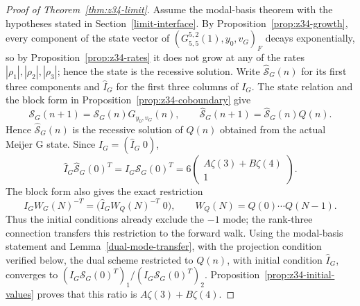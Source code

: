 \documentclass[11pt]{article}
\begin{document}
\begin{proof}[Proof of Theorem~\ref{thm:z34-limit}]
Assume the modal-basis theorem with the hypotheses stated in
Section~\ref{limit-interface}. By Proposition~\ref{prop:z34-growth}, every component of the
state vector of $(G^{5,2}_{5,5}(1),y_0,v_G)_F$ decays exponentially, so by
Proposition~\ref{prop:z34-rates} it does not grow at any of the rates
$|\rho_1|,|\rho_2|,|\rho_3|$; hence the state is the recessive solution.
Write $\widehat{\mathcal S}_G(n)$ for its first three components and
$\widehat I_G$ for the first three columns of $I_G$.
The state relation and the block form in
Proposition~\ref{prop:z34-coboundary} give
\[
\mathcal S_G(n+1)=\mathcal S_G(n)G_{y_0,v_G}(n),
\qquad
\widehat{\mathcal S}_G(n+1)=\widehat{\mathcal S}_G(n)Q(n).
\]
Hence $\widehat{\mathcal S}_G(n)$ is the recessive solution of $Q(n)$
obtained from the actual Meijer G state. Since $I_G=(\widehat I_G\;0)$,
\[
\widehat I_G\widehat{\mathcal S}_G(0)^T
=I_G\mathcal S_G(0)^T
=6\begin{pmatrix}A\zeta(3)+B\zeta(4)\\1\end{pmatrix}.
\]
The block form also gives the exact restriction
\[
I_GW_G(N)^{-T}
=\bigl(\widehat I_GW_Q(N)^{-T}\;0\bigr),
\qquad W_Q(N)=Q(0)\cdots Q(N-1).
\]
Thus the initial conditions already exclude the $-1$ mode; the
rank-three connection transfers this restriction to the forward walk.
Using the modal-basis statement and Lemma~\ref{dual-mode-transfer},
with the projection condition verified below, the dual scheme restricted to
$Q(n)$, with initial condition $\widehat I_G$, converges to
$(I_G\mathcal{S}_G(0)^T)_1/(I_G\mathcal{S}_G(0)^T)_2$.
Proposition~\ref{prop:z34-initial-values} proves that this ratio is
$A\zeta(3)+B\zeta(4)$.


\end{proof}
\end{document}
